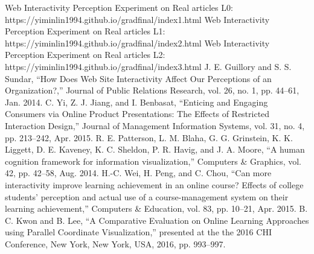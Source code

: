 \documentclass[9pt,journal,compsoc]{IEEEtran}
\begin{document}
\begin{thebibliography}{99}
 Web Interactivity Perception Experiment on Real articles L0: https://yiminlin1994.github.io/gradfinal/index1.html
 Web Interactivity Perception Experiment on Real articles L1: https://yiminlin1994.github.io/gradfinal/index2.html
 Web Interactivity Perception Experiment on Real articles L2: https://yiminlin1994.github.io/gradfinal/index3.html 
 J. E. Guillory and S. S. Sundar, “How Does Web Site Interactivity Affect Our Perceptions of an Organization?,” Journal of Public Relations Research, vol. 26, no. 1, pp. 44–61, Jan. 2014.
 C. Yi, Z. J. Jiang, and I. Benbasat, “Enticing and Engaging Consumers via Online Product Presentations: The Effects of Restricted Interaction Design,” Journal of Management Information Systems, vol. 31, no. 4, pp. 213–242, Apr. 2015.
 R. E. Patterson, L. M. Blaha, G. G. Grinstein, K. K. Liggett, D. E. Kaveney, K. C. Sheldon, P. R. Havig, and J. A. Moore, “A human cognition framework for information visualization,” Computers \& Graphics, vol. 42, pp. 42–58, Aug. 2014.
 H.-C. Wei, H. Peng, and C. Chou, “Can more interactivity improve learning achievement in an online course? Effects of college students' perception and actual use of a course-management system on their learning achievement,” Computers \& Education, vol. 83, pp. 10–21, Apr. 2015.
 B. C. Kwon and B. Lee, “A Comparative Evaluation on Online Learning Approaches using Parallel Coordinate Visualization,” presented at the the 2016 CHI Conference, New York, New York, USA, 2016, pp. 993–997.


\end{thebibliography}
\end{document}
